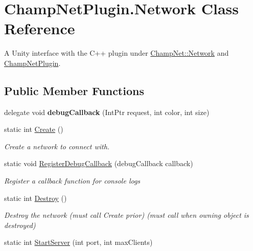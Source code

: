 \hypertarget{class_champ_net_plugin_1_1_network}{\section{Champ\-Net\-Plugin.\-Network Class Reference}
\label{class_champ_net_plugin_1_1_network}
}


A Unity interface with the C++ plugin under \hyperlink{class_champ_net_1_1_network}{Champ\-Net\-::\-Network} and \hyperlink{namespace_champ_net_plugin}{Champ\-Net\-Plugin}.  


\subsection*{Public Member Functions}
\begin{DoxyCompactItemize}
\item 
\hypertarget{class_champ_net_plugin_1_1_network_ae91e1558fdacd55163986aaf2edf3c75}{delegate void {\bfseries debug\-Callback} (Int\-Ptr request, int color, int size)}\label{class_champ_net_plugin_1_1_network_ae91e1558fdacd55163986aaf2edf3c75}

\item 
\hypertarget{class_champ_net_plugin_1_1_network_aac69b7dd1eb986a17ba005cded2581fa}{static int \hyperlink{class_champ_net_plugin_1_1_network_aac69b7dd1eb986a17ba005cded2581fa}{Create} ()}\label{class_champ_net_plugin_1_1_network_aac69b7dd1eb986a17ba005cded2581fa}

\begin{DoxyCompactList}\small\item\em Create a network to connect with. \end{DoxyCompactList}\item 
static void \hyperlink{class_champ_net_plugin_1_1_network_a33f8a1666e92815fc3968ad98fd3f782}{Register\-Debug\-Callback} (debug\-Callback callback)
\begin{DoxyCompactList}\small\item\em Register a callback function for console logs \end{DoxyCompactList}\item 
\hypertarget{class_champ_net_plugin_1_1_network_a38e92ac395f9860fa696d0194ca04f4b}{static int \hyperlink{class_champ_net_plugin_1_1_network_a38e92ac395f9860fa696d0194ca04f4b}{Destroy} ()}\label{class_champ_net_plugin_1_1_network_a38e92ac395f9860fa696d0194ca04f4b}

\begin{DoxyCompactList}\small\item\em Destroy the network (must call Create prior) (must call when owning object is destroyed) \end{DoxyCompactList}\item 
\hypertarget{class_champ_net_plugin_1_1_network_a9d04fdd4e422f9dbf0e20bbbd4209884}{static int \hyperlink{class_champ_net_plugin_1_1_network_a9d04fdd4e422f9dbf0e20bbbd4209884}{Start\-Server} (int port, int max\-Clients)}\label{class_champ_net_plugin_1_1_network_a9d04fdd4e422f9dbf0e20bbbd4209884}


\end{DoxyCompactItemize}
